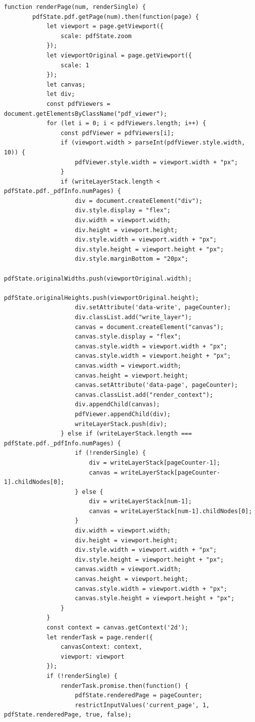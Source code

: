\begin{lstlisting}[style=ES6, caption={Renderfunktion}, label=code:render, breaklines=true]
	function renderPage(num, renderSingle) {
		pdfState.pdf.getPage(num).then(function(page) {
			let viewport = page.getViewport({
				scale: pdfState.zoom
			});
			let viewportOriginal = page.getViewport({
				scale: 1
			});
			let canvas;
			let div;
			const pdfViewers = document.getElementsByClassName("pdf_viewer");
			for (let i = 0; i < pdfViewers.length; i++) {
				const pdfViewer = pdfViewers[i];
				if (viewport.width > parseInt(pdfViewer.style.width, 10)) {
					pdfViewer.style.width = viewport.width + "px";
				}
				if (writeLayerStack.length < pdfState.pdf._pdfInfo.numPages) {
					div = document.createElement("div");
					div.style.display = "flex";
					div.width = viewport.width;
					div.height = viewport.height;
					div.style.width = viewport.width + "px";
					div.style.height = viewport.height + "px";
					div.style.marginBottom = "20px";
					pdfState.originalWidths.push(viewportOriginal.width);
					pdfState.originalHeights.push(viewportOriginal.height);
					div.setAttribute('data-write', pageCounter);
					div.classList.add("write_layer");
					canvas = document.createElement("canvas");
					canvas.style.display = "flex";
					canvas.style.width = viewport.width + "px";
					canvas.style.width = viewport.height + "px";
					canvas.width = viewport.width;
					canvas.height = viewport.height;
					canvas.setAttribute('data-page', pageCounter);
					canvas.classList.add("render_context");
					div.appendChild(canvas);
					pdfViewer.appendChild(div);
					writeLayerStack.push(div);
				} else if (writeLayerStack.length === pdfState.pdf._pdfInfo.numPages) {
					if (!renderSingle) {
						div = writeLayerStack[pageCounter-1];
						canvas = writeLayerStack[pageCounter-1].childNodes[0];
					} else {
						div = writeLayerStack[num-1];
						canvas = writeLayerStack[num-1].childNodes[0];
					}
					div.width = viewport.width;
					div.height = viewport.height;
					div.style.width = viewport.width + "px";
					div.style.height = viewport.height + "px";
					canvas.width = viewport.width;
					canvas.height = viewport.height;
					canvas.style.width = viewport.width + "px";
					canvas.style.height = viewport.height + "px";
				}
			}
			const context = canvas.getContext('2d');
			let renderTask = page.render({
				canvasContext: context,
				viewport: viewport
			});
			if (!renderSingle) {
				renderTask.promise.then(function() {
					pdfState.renderedPage = pageCounter;
					restrictInputValues('current_page', 1, pdfState.renderedPage, true, false);

\end{lstlisting}
